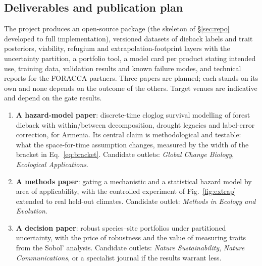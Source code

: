 \subsection{Deliverables and publication plan}
The project produces an open-source package (the skeleton of \S\ref{sec:repo} developed to full implementation), versioned datasets of dieback labels and trait posteriors, viability, refugium and extrapolation-footprint layers with the uncertainty partition, a portfolio tool, a model card per product stating intended use, training data, validation results and known failure modes, and technical reports for the FORACCA partners. Three papers are planned; each stands on its own and none depends on the outcome of the others. Target venues are indicative and depend on the gate results.
\begin{enumerate}
\item \textbf{A hazard-model paper}: discrete-time cloglog survival modelling of forest dieback with within/between decomposition, drought legacies and label-error correction, for Armenia. Its central claim is methodological and testable: what the space-for-time assumption changes, measured by the width of the bracket in Eq.~\eqref{eq:bracket}. Candidate outlets: \emph{Global Change Biology}, \emph{Ecological Applications}.
\item \textbf{A methods paper}: gating a mechanistic and a statistical hazard model by area of applicability, with the controlled experiment of Fig.~\ref{fig:extrap} extended to real held-out climates. Candidate outlet: \emph{Methods in Ecology and Evolution}.
\item \textbf{A decision paper}: robust species--site portfolios under partitioned uncertainty, with the price of robustness and the value of measuring traits from the Sobol' analysis. Candidate outlets: \emph{Nature Sustainability}, \emph{Nature Communications}, or a specialist journal if the results warrant less.
\end{enumerate}

